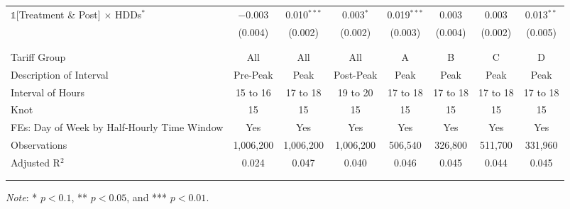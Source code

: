{\begin{table}[t!]
\begin{adjustbox}{scale = 0.75}
\begin{threeparttable}
\begin{tabular}{@{\extracolsep{10pt}}lccccccc}
                    $\mathbb{1}$[Treatment \& Post] $\times$ HDDs$^{*}$ & $-$0.003 & 0.010$^{***}$ & 0.003$^{*}$ & 0.019$^{***}$ & 0.003 & 0.003 & 0.013$^{**}$ \\
                    & (0.004) & (0.002) & (0.002) & (0.003) & (0.004) & (0.002) & (0.005) \\
                    & & & & & & & \\
                    \hline
                    \\[-2.0ex]
                    Tariff Group & All & All & All & A & B & C & D \\
                    Description of Interval & Pre-Peak & Peak & Post-Peak & Peak & Peak & Peak & Peak \\
                    Interval of Hours & 15 to 16 & 17 to 18 & 19 to 20 & 17 to 18 & 17 to 18 & 17 to 18 & 17 to 18 \\
                    Knot & 15 & 15 & 15 & 15 & 15 & 15 & 15 \\
                    FEs: Day of Week by Half-Hourly Time Window & Yes & Yes & Yes & Yes & Yes & Yes & Yes \\
                    Observations & 1,006,200 & 1,006,200 & 1,006,200 & 506,540 & 326,800 & 511,700 & 331,960 \\
                    Adjusted R$^{2}$ & 0.024 & 0.047 & 0.040 & 0.046 & 0.045 & 0.044 & 0.045 \\
                    \\[-2.0ex]
                    \hline \hline
                    \\[-4.5ex]
                \end{tabular}
                \begin{tablenotes}[flushleft]
                    \footnotesize
                    \item \textit{Note}: * $p < 0.1$, ** $p < 0.05$, and *** $p < 0.01$.
                \end{tablenotes}
            \end{threeparttable}
        \end{adjustbox}
    \end{table}
}

